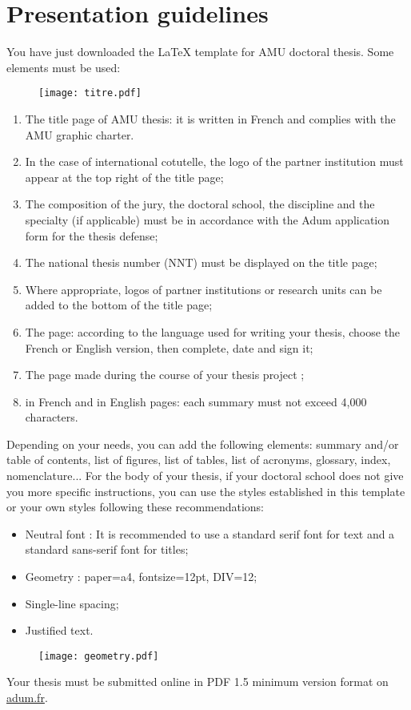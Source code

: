 \chapter{Presentation guidelines}
\label{chap:guidelines}
You have just downloaded the LaTeX template for AMU doctoral thesis. Some elements must be used:
\\


\begin{figure}[h!tbp]
	\centering
	\texttt{[image: titre.pdf]}
\end{figure}

\begin{enumerate}
    \item The title page of AMU thesis: it is written in French and complies with the AMU graphic charter.
    \item In the case of international cotutelle, the logo of the partner institution must appear at the top right of the title page;
	\item The composition of the jury, the doctoral school, the discipline and the specialty (if applicable) must be in accordance with the Adum application form for the thesis defense;
	\item The national thesis number (NNT) must be displayed on the title page;
	\item Where appropriate, logos of partner institutions or research units can be added to the bottom of the title page;
	\item The  page: according to the language used for writing your thesis, choose the French or English version, then complete, date and sign it;
	\item The  page made during the course of your thesis project ;
	\item {} in French and  in English pages: each summary must not exceed 4,000 characters.\\
\end{enumerate}

Depending on your needs, you can add the following elements: summary and/or table of contents, list of figures, list of tables, list of acronyms, glossary, index, nomenclature...
For the body of your thesis, if your doctoral school does not give you more specific instructions, you can use the styles established in this template or your own styles following these recommendations:
\begin{itemize}
	\item Neutral font : It is recommended to use a standard serif font for text and a standard sans-serif font for titles;
	\item Geometry : paper=a4, fontsize=12pt, DIV=12;
	\item Single-line spacing;
	\item Justified text.\\
\end{itemize}

\begin{figure}[h!tbp]
	\centering
	\texttt{[image: geometry.pdf]}
\end{figure}

Your thesis must be submitted online in PDF 1.5 minimum version format on \href{https://www.adum.fr/}{adum.fr}.

